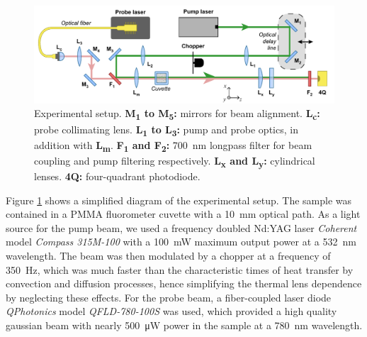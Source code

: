 \documentclass[9pt,twocolumn,twoside]{osajnl}
\newcommand{\FE}{\textit{FE}}
\newcommand{\low}[1]{\textsubscript{#1}}
\begin{document}

\begin{figure}[ht]
	\centering \includegraphics[width=\textwidth]{figures/Setup.pdf}
	\caption{Experimental setup. \textbf{M\low{1} to M\low{5}:} mirrors for beam alignment. \textbf{L\low{c}:} probe collimating lens. \textbf{L\low{1} to L\low{3}:} pump and probe optics, in addition with \textbf{L\low{m}}. \textbf{F\low{1} and F\low{2}:} \SI{700}{\nano\metre} longpass filter for beam coupling and pump filtering respectively. \textbf{L\low{x} and L\low{y}:} cylindrical lenses. \textbf{4Q:} four-quadrant photodiode.}
	\label{fig:Experimental}
\end{figure}

Figure \ref{fig:Experimental} shows a simplified diagram of the experimental setup. The sample was contained in a PMMA fluorometer cuvette with a \SI{10}{\milli\metre} optical path. As a light source for the pump beam, we used a frequency doubled Nd:YAG laser \emph{Coherent} model \emph{Compass 315M-100} with a \SI{100}{\milli\watt} maximum output power at a \SI{532}{\nano\metre} wavelength. The beam was then modulated by a chopper at a frequency of \SI{350}{\hertz}, which was much faster than the characteristic times of heat transfer by convection and diffusion processes, hence simplifying the thermal lens dependence by neglecting these effects. For the probe beam, a fiber-coupled laser diode \emph{QPhotonics} model \emph{QFLD-780-100S} was used, which provided a high quality gaussian beam with nearly \SI{500}{\micro\watt} power in the sample at a \SI{780}{\nano\metre} wavelength.
\end{document}
